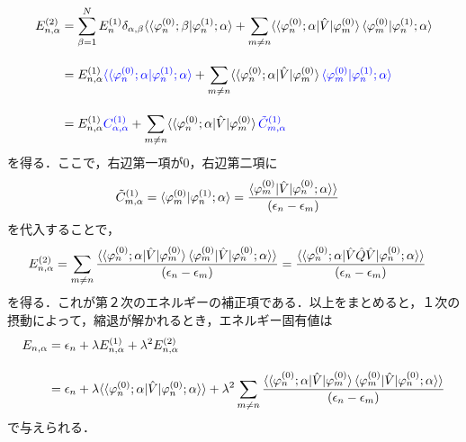 \begin{align}
    E^{(2)}_{n,\alpha}
    &=\sum_{\beta=1}^{N}
    E^{(1)}_n\delta_{\alpha,\beta}
    \langle\braket{\varphi^{(0)}_n;\beta|\varphi^{(1)}_n;\alpha}
    +\sum_{m\neq n}
    \langle\braket{\varphi^{(0)}_{n};\alpha|\hat{V}|\varphi^{(0)}_m}
    \braket{\varphi^{(0)}_m|\varphi^{(1)}_n;\alpha}\nn[10pt]
    &=E^{(1)}_{n,\alpha}
    \textcolor{blue}{\langle\braket{\varphi^{(0)}_n;\alpha|\varphi^{(1)}_n;\alpha}}
    +\sum_{m\neq n}
    \langle\braket{\varphi^{(0)}_{n};\alpha|\hat{V}|\varphi^{(0)}_m}
    \textcolor{blue}{\braket{\varphi^{(0)}_m|\varphi^{(1)}_n;\alpha}}\nn[10pt]
    &=E^{(1)}_{n,\alpha}
    \textcolor{blue}{C^{(1)}_{\alpha,\alpha}}
    +\sum_{m\neq n}
    \langle\braket{\varphi^{(0)}_{n};\alpha|\hat{V}|\varphi^{(0)}_m}
    \textcolor{blue}{\Tilde{C}^{(1)}_{m,\alpha}}
\end{align}
を得る．ここで，右辺第一項が0，右辺第二項に
\begin{align}
    \Tilde{C}^{(1)}_{m,\alpha}=\braket{\varphi^{(0)}_{m}|\varphi^{(1)}_n;\alpha}
    &=\frac{\braket{\varphi^{(0)}_{m}|\hat{V}|\varphi^{(0)}_n;\alpha}\rangle}{(\epsilon_n-\epsilon_m)}
\end{align}
を代入することで，
\begin{align}
    E^{(2)}_{n,\alpha}
    &=
    \sum_{m\neq n}
    \frac{\langle\braket{\varphi^{(0)}_{n};\alpha|\hat{V}|\varphi^{(0)}_m}
    \braket{\varphi^{(0)}_{m}|\hat{V}|\varphi^{(0)}_n;\alpha}\rangle}{(\epsilon_n-\epsilon_m)}
    =
    \frac{\langle\braket{\varphi^{(0)}_{n};\alpha|\hat{V}
    \hat{Q}\hat{V}|\varphi^{(0)}_n;\alpha}\rangle}{(\epsilon_n-\epsilon_m)}
\end{align}
を得る．これが第２次のエネルギーの補正項である．以上をまとめると，１次の摂動によって，縮退が解かれるとき，エネルギー固有値は
\begin{align}\label{1st_2nd_energy}
    E_{n,\alpha}
    &=\epsilon_n + \lambda E^{(1)}_{n,\alpha}
    +\lambda^2
    E^{(2)}_{n,\alpha}\nn[10pt]
    &=\epsilon_n + \lambda \langle\langle{\varphi^{(0)}_n;\alpha|\hat{V}|\varphi^{(0)}_n;\alpha}\rangle\rangle
    +\lambda^2 
    \sum_{m\neq n}
    \frac{\langle\braket{\varphi^{(0)}_{n};\alpha|\hat{V}|\varphi^{(0)}_m}
    \braket{\varphi^{(0)}_{m}|\hat{V}|\varphi^{(0)}_n;\alpha}\rangle}{(\epsilon_n-\epsilon_m)}
\end{align}
で与えられる．



